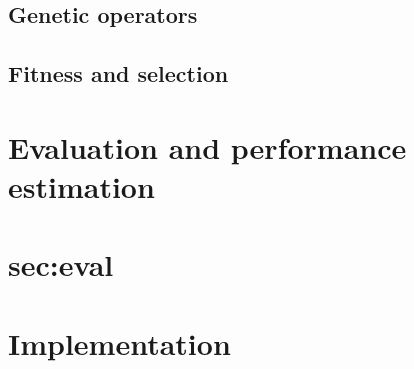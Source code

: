\subsection{Genetic operators}

\subsection{Fitness and selection}

\section{Evaluation and performance estimation} \section{sec:eval}

\section{Implementation}